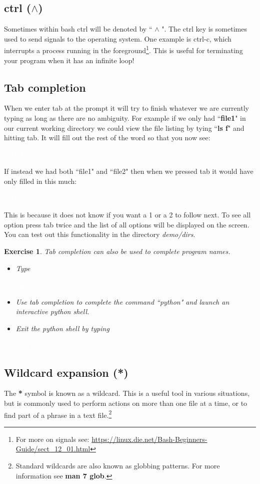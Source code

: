 \documentclass[oneside]{book}
\newcommand{\commandline}[1]{\begin{center} \colorbox{Dark}{\textcolor{white}{#1}} \end{center}}
\newtheorem{ex}{Exercise}[chapter]
\begin{document}
\subsection{ctrl ($\wedge$)}
Sometimes within bash ctrl will be denoted by `` $\wedge$ ". The ctrl key is sometimes used to send signals to the operating system. One example is ctrl-c, which interrupts a process running in the foreground\footnote{For more on signals see:  \url{https://linux.die.net/Bash-Beginners-Guide/sect_12_01.html}}. This is useful for terminating your program when it has an infinite loop!

\subsection{Tab completion}
When we enter tab at the prompt it will try to finish whatever we are currently typing as long as there are no ambiguity. For example if we only had ``\textbf{file1}" in our current working directory we could view the file listing by tying ``\textbf{ls f}" and hitting tab. It will fill out the rest of the word so that you now see:
\commandline{ls file1}
If instead we had both ``file1" and ``file2" then when we pressed tab it would have only filled in this much:
\commandline{ls file}
This is because it does not know if you want a 1 or a 2 to follow next. To see all option press tab twice and the list of all options will be displayed on the screen. You can test out this functionality in the directory \textit{demo/dirs}.\\

\begin{ex}
    Tab completion can also be used to complete program names.
    \begin{itemize} 
        \item Type \commandline{pyt}
        \item Use tab completion to complete the command ``python" and launch an interactive python shell.
        \item Exit the python shell by typing \commandline{exit()}
    \end{itemize}
\end{ex}

\subsection{Wildcard expansion (*)}
The \textbf{*} symbol is known as a wildcard. This is a useful tool in various situations, but is commonly used to perform actions on more than one file at a time, or to find part of a phrase in a text file.\footnote{Standard wildcards are also known as globbing patterns. For more information see \textbf{man 7 glob}.} 
\end{document}
